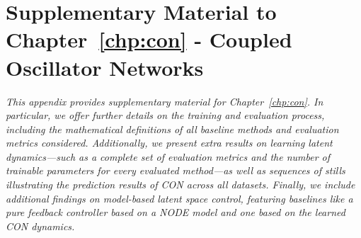 \chapter{Supplementary Material to Chapter~\ref{chp:con} - Coupled Oscillator Networks
}\label{chp:apx:con}

\textit{
\noindent This appendix provides supplementary material for Chapter~\ref{chp:con}. In particular, we offer further details on the training and evaluation process, including the mathematical definitions of all baseline methods and evaluation metrics considered. Additionally, we present extra results on learning latent dynamics—such as a complete set of evaluation metrics and the number of trainable parameters for every evaluated method—as well as sequences of stills illustrating the prediction results of \gls{CON} across all datasets. Finally, we include additional findings on model-based latent space control, featuring baselines like a pure feedback controller based on a \gls{NODE} model and one based on the learned \gls{CON} dynamics.
}


\newpage


\newpage

\newpage

% 